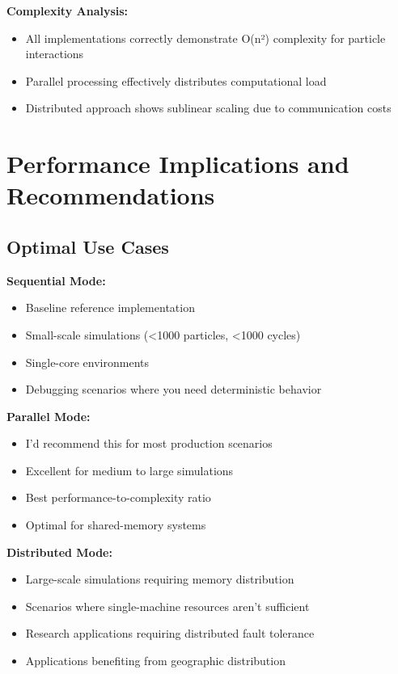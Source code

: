 \documentclass[12pt,a4paper]{article}
\begin{document}
\textbf{Complexity Analysis:}
\begin{itemize}
    \item All implementations correctly demonstrate O(n²) complexity for particle interactions
    \item Parallel processing effectively distributes computational load
    \item Distributed approach shows sublinear scaling due to communication costs
\end{itemize}

\section{Performance Implications and Recommendations}

\subsection{Optimal Use Cases}

\textbf{Sequential Mode:}
\begin{itemize}
    \item Baseline reference implementation
    \item Small-scale simulations (<1000 particles, <1000 cycles)
    \item Single-core environments
    \item Debugging scenarios where you need deterministic behavior
\end{itemize}

\textbf{Parallel Mode:}
\begin{itemize}
    \item I'd recommend this for most production scenarios
    \item Excellent for medium to large simulations
    \item Best performance-to-complexity ratio
    \item Optimal for shared-memory systems
\end{itemize}

\textbf{Distributed Mode:}
\begin{itemize}
    \item Large-scale simulations requiring memory distribution
    \item Scenarios where single-machine resources aren't sufficient
    \item Research applications requiring distributed fault tolerance
    \item Applications benefiting from geographic distribution
\end{itemize}
\end{document}
